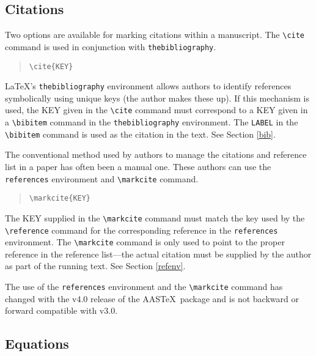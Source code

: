 \subsection{Citations}   \label{cites}

Two options are available for marking citations within a manuscript.
The \verb"\cite" command is used in conjunction with {\tt thebibliography}.

\begin{quote}
\verb"\cite{KEY}"
\end{quote}

\LaTeX's {\tt thebibliography} environment allows authors to identify
references symbolically using unique keys (the author makes these up).
If this mechanism is used, the {\small KEY} given in the \verb"\cite"
command must correspond to a {\small KEY} given in a \verb"\bibitem"
command in the {\tt thebibliography} environment.
The {\tt LABEL} in the \verb"\bibitem" command is used as the citation in
the text. See Section \ref{bib}.

The conventional method used by authors to manage the citations and
reference list in a paper has often been a manual one.  These authors can use 
the {\tt references} environment and \verb"\markcite" command.

\begin{quote}
\verb"\markcite{KEY}"
\end{quote}

The {\small KEY} supplied in the \verb"\markcite" command must match the 
key used by the \verb"\reference" command for the corresponding reference 
in the {\tt references} environment.  The \verb"\markcite" command is
only used to point to the proper reference in the reference list---the actual
citation must be supplied by the author as part of the running text.
See Section \ref{refenv}.

The use of the {\tt references} environment and the \verb"\markcite" command
has changed with the v4.0 release of the AAS\TeX\ package and is not 
backward or forward compatible with v3.0.  


\subsection{Equations}

